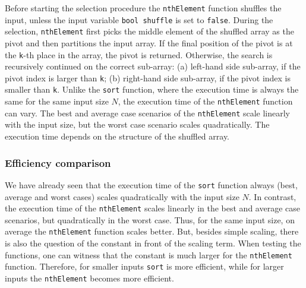 \documentclass[11pt]{article}
\newcommand{\ct}[1]{\texttt{#1}}
\begin{document}
Before starting the selection procedure the \ct{nthElement} function shuffles the input, unless the input variable \ct{bool shuffle} is set to \ct{false}. During the selection, \ct{nthElement} first picks the middle element of the shuffled array as the pivot and then partitions the input array. If the final position of the pivot is at the \ct{k}-th place in the array, the pivot is returned. Otherwise, the search is recursively continued on the correct sub-array: (a) left-hand side sub-array, if the pivot index is larger than \ct{k}; (b) right-hand side sub-array, if the pivot index is smaller than \ct{k}. Unlike the \ct{sort} function, where the execution time is always the same for the same input size $N$, the execution time of the \ct{nthElement} function can vary. The best and average case scenarios of the \ct{nthElement} scale linearly with the input size, but the worst case scenario scales quadratically. The execution time depends on the structure of the shuffled array. 


\subsubsection{Efficiency comparison} %
\label{ssub:efficiency_comparison}


We have already seen that the execution time of the \ct{sort} function always (best, average and worst cases) scales quadratically with the input size $N$. In contrast, the execution time of the \ct{nthElement} scales linearly in the best and average case scenarios, but quadratically in the worst case. Thus, for the same input size, on average the \ct{nthElement} function scales better. But, besides simple scaling, there is also the question of the constant in front of the scaling term. When testing the functions, one can witness that the constant is much larger for the \ct{nthElement} function. Therefore, for smaller inputs \ct{sort} is more efficient, while for larger inputs the \ct{nthElement} becomes more efficient.       
\end{document}
